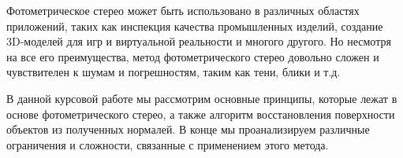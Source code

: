 Фотометрическое стерео может быть использовано в различных
областях приложений, таких как инспекция качества
промышленных изделий, создание 3D-моделей для игр и виртуальной
реальности и многого другого. Но несмотря на все его
преимущества, метод фотометрического стерео довольно сложен
и чувствителен к шумам и погрешностям, таким как тени,
блики и т.д.

В данной курсовой работе мы рассмотрим основные принципы, которые
лежат в основе фотометрического стерео, а также алгоритм
восстановления поверхности объектов из полученных нормалей.
В конце мы проанализируем различные ограничения и сложности,
связанные с применением этого метода.
